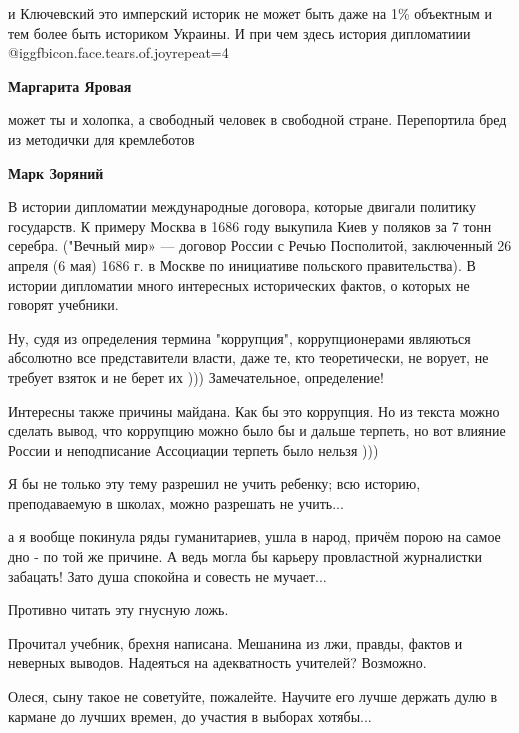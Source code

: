 \begin{itemize}
\begin{itemize}
и Ключевский это имперский историк не может быть даже на 1\% объектным и тем
более быть историком Украины. И при чем здесь история дипломатиии @igg{fbicon.face.tears.of.joy}{repeat=4} 

\textbf{Маргарита Яровая} 

может ты и холопка, а свободный человек в свободной стране. Перепортила бред из
методички для кремлеботов

\textbf{Марк Зоряний} 

В истории дипломатии международные договора, которые двигали политику
государств. К примеру Москва в 1686 году выкупила Киев у поляков за 7 тонн
серебра. ("Вечный мир» — договор России с Речью Посполитой, заключенный 26
апреля (6 мая) 1686 г. в Москве по инициативе польского правительства). В
истории дипломатии много интересных исторических фактов, о которых не говорят
учебники.

\end{itemize} %


Ну, судя из определения термина "коррупция", коррупционерами являються
абсолютно все представители власти, даже те, кто теоретически, не ворует, не
требует взяток и не берет их ))) Замечательное, определение!

Интересны также причины майдана. Как бы это коррупция. Но из текста можно
сделать вывод, что коррупцию можно было бы и дальше терпеть, но вот влияние
России и неподписание Ассоциации терпеть было нельзя )))

Я бы не только эту тему разрешил не учить ребенку; всю историю, преподаваемую в
школах, можно разрешать не учить...


а я вообще покинула ряды гуманитариев, ушла в народ, причём порою на самое дно
- по той же причине. А ведь могла бы карьеру провластной журналистки забацать!
Зато душа спокойна и совесть не мучает...

Противно читать эту гнусную ложь.

Прочитал учебник, брехня написана. Мешанина из лжи, правды, фактов и неверных выводов. Надеяться на адекватность учителей? Возможно.

Олеся, сыну такое не советуйте, пожалейте. Научите его лучше держать дулю в кармане до лучших времен, до участия в выборах хотябы...
\end{itemize} %
